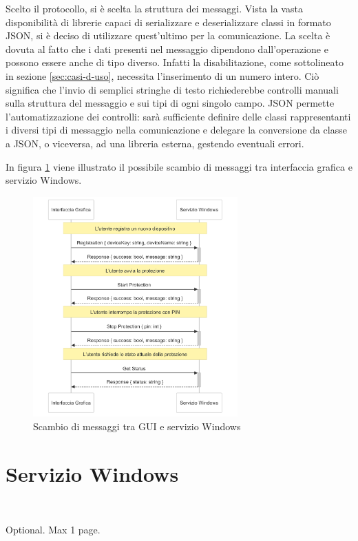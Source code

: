 \documentclass[12pt,a4paper,openright,twoside]{book}
\begin{document}
Scelto il protocollo, si è scelta la struttura dei messaggi.
Vista la vasta disponibilità di librerie capaci di serializzare e deserializzare classi in formato JSON, si è deciso di utilizzare quest'ultimo per la comunicazione.
La scelta è dovuta al fatto che i dati presenti nel messaggio dipendono dall'operazione e possono essere anche di tipo diverso. Infatti la disabilitazione, come sottolineato in sezione \ref{sec:casi-d-uso}, necessita l'inserimento di un numero intero.
Ciò significa che l'invio di semplici stringhe di testo richiederebbe controlli manuali sulla struttura del messaggio e sui tipi di ogni singolo campo.
JSON permette l'automatizzazione dei controlli: sarà sufficiente definire delle classi rappresentanti i diversi tipi di messaggio nella comunicazione e delegare la conversione da classe a JSON, o viceversa, ad una libreria esterna, gestendo eventuali errori.

In figura \ref{fig:schema-messaggi-gui-service} viene illustrato il possibile scambio di messaggi tra interfaccia grafica e servizio Windows.

\begin{figure}[h]
	\centering
	\includegraphics[width=0.7\textwidth]{figures/schema-messaggi-gui-service.png}
	\caption{Scambio di messaggi tra GUI e servizio Windows}
	\label{fig:schema-messaggi-gui-service}
\end{figure}

\section{Servizio Windows}


\backmatter\




\begin{acknowledgements} %
Optional. Max 1 page.
\end{acknowledgements}
\end{document}

